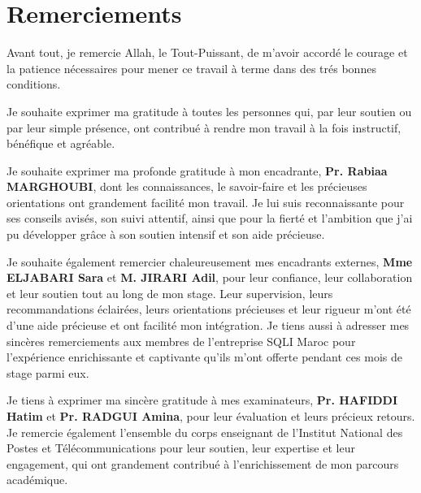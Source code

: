 \chapter*{Remerciements}



Avant tout, je remercie Allah, le Tout-Puissant, de m'avoir accordé le courage et la patience nécessaires pour mener ce travail à terme dans des trés bonnes conditions.

\vspace{10pt}
Je souhaite exprimer ma gratitude à toutes les personnes qui, par leur soutien ou par leur simple présence, ont contribué à rendre mon travail à la fois instructif, bénéfique et agréable.

\vspace{10pt}
Je souhaite exprimer ma profonde gratitude à mon encadrante, \textbf{Pr. Rabiaa MARGHOUBI}, dont les connaissances, le savoir-faire et les précieuses orientations ont grandement facilité mon travail. Je lui suis reconnaissante pour ses conseils avisés, son suivi attentif, ainsi que pour la fierté et l'ambition que j'ai pu développer grâce à son soutien intensif et son aide précieuse.

\vspace{10pt}
Je souhaite également remercier chaleureusement mes encadrants externes, \textbf{Mme ELJABARI Sara} et \textbf{M. JIRARI Adil}, pour leur confiance, leur collaboration et leur soutien tout au long de mon stage. Leur supervision, leurs recommandations éclairées, leurs orientations précieuses et leur rigueur m'ont été d'une aide précieuse et ont facilité mon intégration. Je tiens aussi à adresser mes sincères remerciements aux membres de l'entreprise SQLI Maroc pour l'expérience enrichissante et captivante qu'ils m'ont offerte pendant ces mois de stage parmi eux.

\vspace{10pt}
Je tiens à exprimer ma sincère gratitude à mes examinateurs, \textbf{Pr. HAFIDDI Hatim} et \textbf{Pr. RADGUI Amina}, pour leur évaluation et leurs précieux retours. Je remercie également l'ensemble du corps enseignant de l’Institut National des Postes et Télécommunications pour leur soutien, leur expertise et leur engagement, qui ont grandement contribué à l’enrichissement de mon parcours académique.
